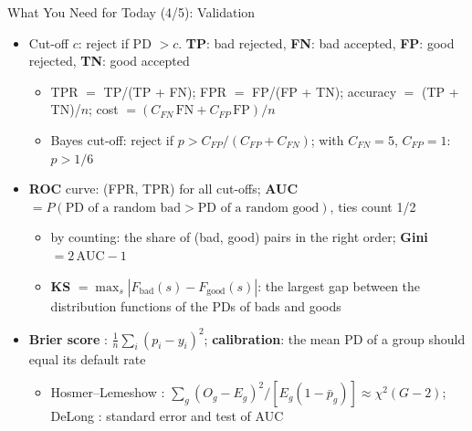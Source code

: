 \begin{frame}{What You Need for Today (4/5): Validation}
\itemsize{\footnotesize}
\begin{itemize}
    \item Cut-off $c$: reject if PD $> c$. \textbf{TP}: bad rejected, \textbf{FN}: bad accepted, \textbf{FP}: good rejected, \textbf{TN}: good accepted
    \begin{itemize}
        \item TPR $= $ TP/(TP + FN); FPR $= $ FP/(FP + TN); accuracy $=$ (TP + TN)/$n$; cost $= (C_{FN}\,\mathrm{FN} + C_{FP}\,\mathrm{FP})/n$
        \item Bayes cut-off: reject if $p > C_{FP}/(C_{FP} + C_{FN})$; with $C_{FN} = 5$, $C_{FP} = 1$: $p > 1/6$
    \end{itemize}
    \item \textbf{ROC} curve: (FPR, TPR) for all cut-offs; \textbf{AUC} $= P(\text{PD of a random bad} > \text{PD of a random good})$, ties count 1/2 
    \begin{itemize}
        \item by counting: the share of (bad, good) pairs in the right order; \textbf{Gini} $= 2\,\mathrm{AUC} - 1$
        \item \textbf{KS} $= \max_s |F_{\text{bad}}(s) - F_{\text{good}}(s)|$: the largest gap between the distribution functions of the PDs of bads and goods
    \end{itemize}
    \item \textbf{Brier score} : $\frac1n\sum_i (p_i - y_i)^2$; \textbf{calibration}: the mean PD of a group should equal its default rate
    \begin{itemize}
        \item Hosmer--Lemeshow : $\sum_g (O_g - E_g)^2/[E_g(1 - \bar p_g)] \approx \chi^2(G - 2)$; DeLong : standard error and test of AUC
    \end{itemize}
\end{itemize}
\end{frame}

